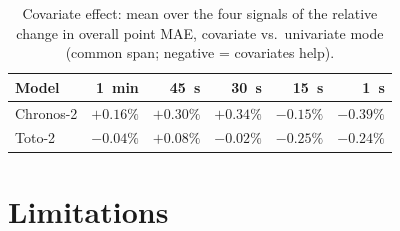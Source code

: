 \begin{table}[htbp]
\centering
\caption[Covariate effect on point MAE]{Covariate effect: mean over the
four signals of the relative change in overall point MAE, covariate
vs.\ univariate mode (common span; negative = covariates help).}
\label{tab:pred-cov}
\small
\begin{tabular}{lrrrrr}
\toprule
Model & \SI{1}{\minute} & \SI{45}{\second} & \SI{30}{\second} & \SI{15}{\second} & \SI{1}{\second} \\
\midrule
Chronos-2 & $+0.16\%$ & $+0.30\%$ & $+0.34\%$ & $-0.15\%$ & $-0.39\%$ \\
Toto-2    & $-0.04\%$ & $+0.08\%$ & $-0.02\%$ & $-0.25\%$ & $-0.24\%$ \\
\bottomrule
\end{tabular}
\end{table}

\section{Limitations}
\label{sec:pred-limitations}

